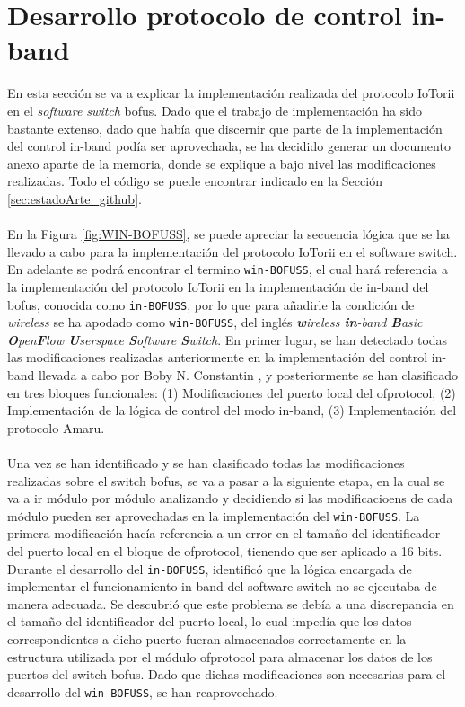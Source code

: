 \section{Desarrollo protocolo de control in-band}
\label{sec:bofussDEV}


En esta sección se va a explicar la implementación realizada del protocolo IoTorii en el \textit{software switch} \gls{bofus}. Dado que el trabajo de implementación ha sido bastante extenso, dado que había que discernir que parte de la implementación del control in-band podía ser aprovechada, se ha decidido generar un documento anexo \cite{davidBOFUSS} aparte de la memoria, donde se explique a bajo nivel las modificaciones realizadas. Todo el código se puede encontrar indicado en la Sección \ref{sec:estadoArte_github}. \\
\\
En la Figura \ref{fig:WIN-BOFUSS}, se puede apreciar la secuencia lógica que se ha llevado a cabo para la implementación del protocolo IoTorii en el software switch. En adelante se podrá encontrar el termino \texttt{win-BOFUSS}, el cual hará referencia a la implementación del protocolo IoTorii en la implementación de in-band del \gls{bofus}, conocida como \texttt{in-BOFUSS}, por lo que para añadirle la condición de \textit{wireless} se ha apodado como \texttt{win-BOFUSS}, del inglés \textit{\textbf{w}ireless \textbf{in}-band \textbf{B}asic \textbf{O}pen\textbf{F}low \textbf{U}serspace \textbf{S}oftware \textbf{S}witch}. En primer lugar, se han detectado todas las modificaciones realizadas anteriormente en la implementación del control in-band llevada a cabo por Boby N. Constantin \cite{constantin2020desarrollo}, y posteriormente se han clasificado en tres bloques funcionales: (1) Modificaciones del puerto local del ofprotocol, (2) Implementación de la  lógica de control del modo in-band, (3) Implementación del protocolo Amaru.\\
\\
Una vez se han identificado y se han clasificado todas las modificaciones realizadas sobre el switch \gls{bofus}, se va a pasar a la siguiente etapa, en la cual se va a ir módulo por módulo analizando y decidiendo si las modificacioens de cada módulo pueden ser aprovechadas en la implementación del \texttt{win-BOFUSS}. La primera modificación hacía referencia a un error en el tamaño del identificador del puerto local en el bloque de ofprotocol, tienendo que ser aplicado a 16 bits. Durante el desarrollo del \texttt{in-BOFUSS}, identificó que la lógica encargada de implementar el funcionamiento in-band del software-switch no se ejecutaba de manera adecuada. Se descubrió que este problema se debía a una discrepancia en el tamaño del identificador del puerto local, lo cual impedía que los datos correspondientes a dicho puerto fueran almacenados correctamente en la estructura utilizada por el módulo ofprotocol para almacenar los datos de los puertos del switch \gls{bofus}. Dado que dichas modificaciones son necesarias para el desarrollo del \texttt{win-BOFUSS}, se han reaprovechado.\\
